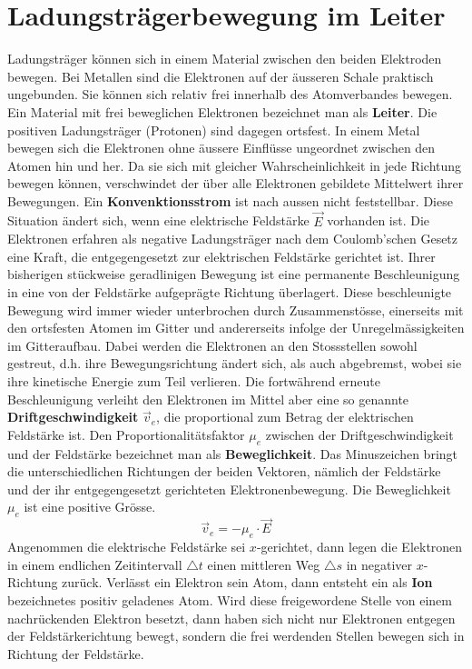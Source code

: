 \section{Ladungsträgerbewegung im Leiter}
Ladungsträger können sich in einem Material zwischen den beiden Elektroden bewegen. Bei Metallen sind die Elektronen auf der äusseren Schale praktisch ungebunden. Sie können sich relativ frei innerhalb des Atomverbandes bewegen. Ein Material mit frei beweglichen Elektronen bezeichnet man als \textbf{Leiter}. Die positiven Ladungsträger (Protonen) sind dagegen ortsfest. In einem Metal bewegen sich die Elektronen ohne äussere Einflüsse ungeordnet zwischen den Atomen hin und her. Da sie sich mit gleicher Wahrscheinlichkeit in jede Richtung bewegen können, verschwindet der über alle Elektronen gebildete Mittelwert ihrer Bewegungen.
\newline\newline
Ein \textbf{Konvenktionsstrom} ist nach aussen nicht feststellbar. Diese Situation ändert sich, wenn eine elektrische Feldstärke $\overrightarrow{E}$ vorhanden ist. Die Elektronen erfahren als negative Ladungsträger nach dem Coulomb'schen Gesetz eine Kraft, die entgegengesetzt zur elektrischen Feldstärke gerichtet ist. Ihrer bisherigen stückweise geradlinigen Bewegung ist eine permanente Beschleunigung in eine von der Feldstärke aufgeprägte Richtung überlagert.
\newline\newline
Diese beschleunigte Bewegung wird immer wieder unterbrochen durch Zusammenstösse, einerseits mit den ortsfesten Atomen im Gitter und andererseits infolge der Unregelmässigkeiten im Gitteraufbau. Dabei werden die Elektronen an den Stossstellen sowohl gestreut, d.h. ihre Bewegungsrichtung ändert sich, als auch abgebremst, wobei sie ihre kinetische Energie zum Teil verlieren.
\newline\newline
Die fortwährend erneute Beschleunigung verleiht den Elektronen im Mittel aber eine so genannte \textbf{Driftgeschwindigkeit} $\overrightarrow{v}_e$, die proportional zum Betrag der elektrischen Feldstärke ist. Den Proportionalitätsfaktor $\mu_e$ zwischen der Driftgeschwindigkeit und der Feldstärke bezeichnet man als \textbf{Beweglichkeit}. Das Minuszeichen bringt die unterschiedlichen Richtungen der beiden Vektoren, nämlich der Feldstärke und der ihr entgegengesetzt gerichteten Elektronenbewegung. Die Beweglichkeit $\mu_e$ ist eine positive Grösse.
\begin{equation}
\boxed{\overrightarrow{v}_e=-\mu_e\cdot \overrightarrow{E}}
\end{equation}
Angenommen die elektrische Feldstärke sei $x$-gerichtet, dann legen die Elektronen in einem endlichen Zeitintervall $\triangle t$ einen mittleren Weg $\triangle s$ in negativer $x$-Richtung zurück. Verlässt ein Elektron sein Atom, dann entsteht ein als \textbf{Ion} bezeichnetes positiv geladenes Atom. Wird diese freigewordene Stelle von einem nachrückenden Elektron besetzt, dann haben sich nicht nur Elektronen entgegen der Feldstärkerichtung bewegt, sondern die frei werdenden Stellen bewegen sich in Richtung der Feldstärke.
